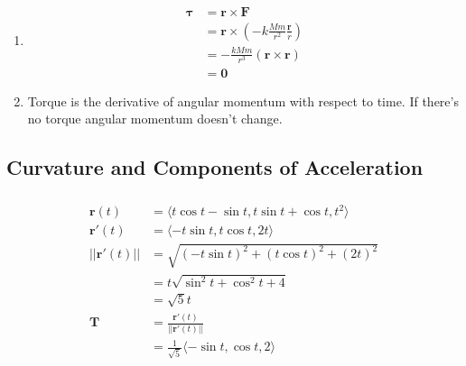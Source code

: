 \documentclass{article}
\begin{document}
\setcounter{subsubsection}{28}
\subsubsection{}

\begin{enumerate}
  \item

        \begin{align*}
          \boldsymbol{\tau} & = \mathbf{r \times F}                                                      \\
                            & = \mathbf{r} \times \left( -k \frac{M m}{r^2} \frac{\mathbf{r}}{r} \right) \\
                            & = -\frac{k M m}{r^3} (\mathbf{r \times r})                                 \\
                            & = \mathbf{0}
        \end{align*}

  \item Torque is the derivative of angular momentum with respect to time. If there's no torque angular momentum doesn't change.
\end{enumerate}

\subsection{Curvature and Components of Acceleration}

\subsubsection{}

\begin{align*}
  \mathbf{r}(t)      & = \langle t \cos t - \sin t, t \sin t + \cos t, t^2 \rangle \\
  \mathbf{r}'(t)     & = \langle -t \sin t, t \cos t, 2 t \rangle                  \\
  ||\mathbf{r}'(t)|| & = \sqrt{(-t \sin t)^2 + (t \cos t)^2 + (2 t)^2}             \\
                     & = t \sqrt{\sin^2 t + \cos^2 t + 4}                          \\
                     & = \sqrt{5} t                                                \\
  \mathbf{T}         & = \frac{\mathbf{r}'(t)}{||\mathbf{r}'(t)||}                 \\
                     & = \frac{1}{\sqrt{5}} \langle -\sin t, \cos t, 2 \rangle
\end{align*}
\end{document}
